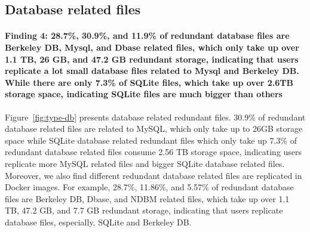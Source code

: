 \subsection{Database related files}
\paragraph{Finding 4: 28.7\%, 30.9\%, and 11.9\% of redundant database files are Berkeley DB, Mysql, and Dbase related files, which only take up over 1.1 TB, 26 GB, and 47.2 GB redundant storage, indicating that users replicate a lot small database files related to Mysql and Berkeley DB. While there are only 7.3\% of SQLite files, which take up over 2.6TB storage space, indicating SQLite files are much bigger than others}

Figure~\ref{fig:type-db} presents database related redundant files. 30.9\% of redundant database related files are related to MySQL, which only take up to 26GB storage space while SQLite database related redundant files which only take up 7.3\% of redundant database related files consume 2.56 TB storage space, indicating users replicate more MySQL related files and bigger SQLite database related files. %
Moreover, we also find different redundant database related files are replicated in Docker images. For example, 28.7\%, 11.86\%, and 5.57\% of redundant database files are Berkeley DB, Dbase, and NDBM related files, which take up over 1.1 TB, 47.2 GB, and 7.7 GB redundant storage, indicating that users replicate database files, especially, SQLite and Berkeley DB. 


